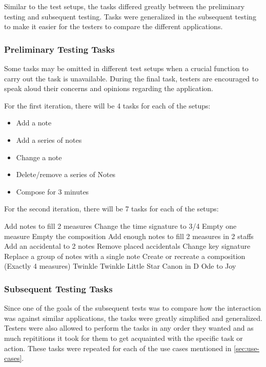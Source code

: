			Similar to the test setups, the tasks differed greatly between the preliminary testing and subsequent testing. Tasks were generalized in the subsequent testing to make it easier for the testers to compare the different applications.

			\subsubsection{Preliminary Testing Tasks}
			\label{sec:preliminary-tasks}

				Some tasks may be omitted in different test setups when a crucial function to carry out the task is unavailable. During the final task, testers are encouraged to speak aloud their concerns and opinions regarding the application.

				For the first iteration, there will be 4 tasks for each of the setups:
				\begin{itemize}
					\item Add a note
					\item Add a series of notes
					\item Change a note
					\item Delete/remove a series of Notes
					\item Compose for 3 minutes
				\end{itemize}

				For the second iteration, there will be 7 tasks for each of the setups:
				\begin{outline}
					\1 Add notes to fill 2 measures
					\1 Change the time signature to 3/4
					\1 Empty one measure
					\1 Empty the composition
					\1 Add enough notes to fill 2 measures in 2 staffs
					\1 Add an accidental to 2 notes
					\1 Remove placed accidentals 
					\1 Change key signature
					\1 Replace a group of notes with a single note
					\1 Create or recreate a composition (Exactly 4 measures)
						\2 Twinkle Twinkle Little Star
						\2 Canon in D
						\2 Ode to Joy
				\end{outline}

			\subsubsection{Subsequent Testing Tasks}
			\label{sec:subsequent-tasks}

				Since one of the goals of the subsequent tests was to compare how the interaction was against similar applications, the tasks were greatly simplified and generalized. Testers were also allowed to perform the tasks in any order they wanted and as much repititions it took for them to get acquainted with the specific task or action. These tasks were repeated for each of the use cases mentioned in \ref{sec:use-cases}.

